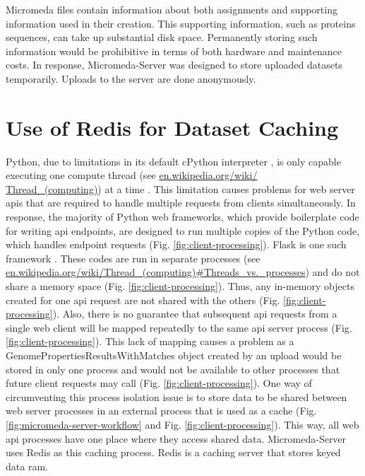Micromeda files contain information about both assignments and supporting information used in their creation. This supporting information, such as proteins sequences, can take up substantial disk space. Permanently storing such information would be prohibitive in terms of both hardware and maintenance costs. In response, Micromeda-Server was designed to store uploaded datasets temporarily. Uploads to the server are done anonymously. 

\section{Use of Redis for Dataset Caching} \label{redis-caching}

Python, due to limitations in its default cPython interpreter \cite{van1995python}, is only capable executing one compute thread \cite{saltzer1966traffic} (see \href{en.wikipedia.org/wiki/Thread\_(computing)}{en.wikipedia.org/wiki/ \\ Thread\_(computing)}) at a time \cite{beazley2010understanding}. This limitation causes problems for web server \gls{api}s that are required to handle multiple requests from clients simultaneously. In response, the majority of Python web frameworks, which provide boilerplate code for writing \gls{api} endpoints, are designed to run multiple copies of the Python code, which handles endpoint requests (Fig. \ref{fig:client-processing}). Flask is one such framework \cite{grinberg2018flask}. These codes are run in separate processes (see \href{en.wikipedia.org/wiki/Thread\_(computing)\#Threads\_vs.\_processes}{en.wikipedia.org/wiki/Thread\_(computing)\#Threads\_vs.\_processes}) and do not share a memory space (Fig. \ref{fig:client-processing}). Thus, any in-memory objects created for one \gls{api} request are not shared with the others (Fig. \ref{fig:client-processing}). Also, there is no guarantee that subsequent \gls{api} requests from a single web client will be mapped repeatedly to the same \gls{api} server process (Fig. \ref{fig:client-processing}). This lack of mapping causes a problem as a GenomePropertiesResultsWithMatches object created by an upload would be stored in only one process and would not be available to other processes that future client requests may call (Fig. \ref{fig:client-processing}). One way of circumventing this process isolation issue is to store data to be shared between web server processes in an external process that is used as a cache (Fig. \ref{fig:micromeda-server-workflow} and Fig. \ref{fig:client-processing}). This way, all web \gls{api} processes have one place where they access shared data. Micromeda-Server uses Redis as this caching process. Redis is a caching server that stores keyed data \gls{ram}. 

